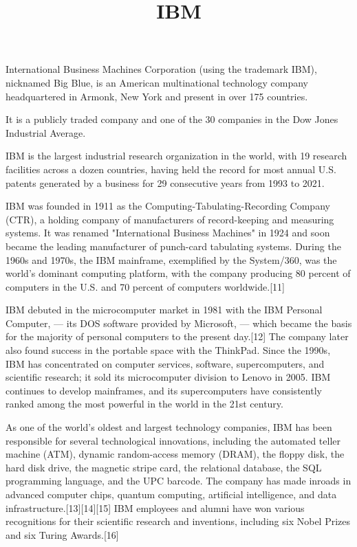 \documentclass[11pt,a4paper]{article}
\title{IBM}
\begin{document}
\maketitle

International Business Machines Corporation (using the trademark IBM), nicknamed Big Blue, is an American multinational technology company headquartered in Armonk, New York and present in over 175 countries.

It is a publicly traded company and one of the 30 companies in the Dow Jones Industrial Average.

IBM is the largest industrial research organization in the world, with 19 research facilities across a dozen countries, having held the record for most annual U.S. patents generated by a business for 29 consecutive years from 1993 to 2021.

IBM was founded in 1911 as the Computing-Tabulating-Recording Company (CTR), a holding company of manufacturers of record-keeping and measuring systems. It was renamed "International Business Machines" in 1924 and soon became the leading manufacturer of punch-card tabulating systems. During the 1960s and 1970s, the IBM mainframe, exemplified by the System/360, was the world's dominant computing platform, with the company producing 80 percent of computers in the U.S. and 70 percent of computers worldwide.[11]

IBM debuted in the microcomputer market in 1981 with the IBM Personal Computer, — its DOS software provided by Microsoft, — which became the basis for the majority of personal computers to the present day.[12] The company later also found success in the portable space with the ThinkPad. Since the 1990s, IBM has concentrated on computer services, software, supercomputers, and scientific research; it sold its microcomputer division to Lenovo in 2005. IBM continues to develop mainframes, and its supercomputers have consistently ranked among the most powerful in the world in the 21st century.

As one of the world's oldest and largest technology companies, IBM has been responsible for several technological innovations, including the automated teller machine (ATM), dynamic random-access memory (DRAM), the floppy disk, the hard disk drive, the magnetic stripe card, the relational database, the SQL programming language, and the UPC barcode. The company has made inroads in advanced computer chips, quantum computing, artificial intelligence, and data infrastructure.[13][14][15] IBM employees and alumni have won various recognitions for their scientific research and inventions, including six Nobel Prizes and six Turing Awards.[16]
\end{document}
